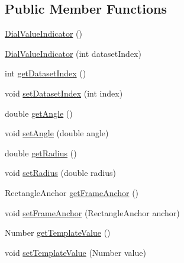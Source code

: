 \subsection*{Public Member Functions}
\begin{DoxyCompactItemize}
\item 
\mbox{\hyperlink{classorg_1_1jfree_1_1chart_1_1plot_1_1dial_1_1_dial_value_indicator_a1e55ae9101de0a8c56baef2b03b89a24}{Dial\+Value\+Indicator}} ()
\item 
\mbox{\hyperlink{classorg_1_1jfree_1_1chart_1_1plot_1_1dial_1_1_dial_value_indicator_a94ae1c9c8adc8b6a51ace19bdb0f73bc}{Dial\+Value\+Indicator}} (int dataset\+Index)
\item 
int \mbox{\hyperlink{classorg_1_1jfree_1_1chart_1_1plot_1_1dial_1_1_dial_value_indicator_adc50504d695c87e02091fa5e50fe5d5d}{get\+Dataset\+Index}} ()
\item 
void \mbox{\hyperlink{classorg_1_1jfree_1_1chart_1_1plot_1_1dial_1_1_dial_value_indicator_a0880bbfe31f19c02655f9565c9ac9e16}{set\+Dataset\+Index}} (int index)
\item 
double \mbox{\hyperlink{classorg_1_1jfree_1_1chart_1_1plot_1_1dial_1_1_dial_value_indicator_a46cace0b19e63ed86380fd39d767fcc0}{get\+Angle}} ()
\item 
void \mbox{\hyperlink{classorg_1_1jfree_1_1chart_1_1plot_1_1dial_1_1_dial_value_indicator_a14bf800c9619a29265c1523a5eed0e41}{set\+Angle}} (double angle)
\item 
double \mbox{\hyperlink{classorg_1_1jfree_1_1chart_1_1plot_1_1dial_1_1_dial_value_indicator_a00272dd6350f35bbbd29f744685cb692}{get\+Radius}} ()
\item 
void \mbox{\hyperlink{classorg_1_1jfree_1_1chart_1_1plot_1_1dial_1_1_dial_value_indicator_a61cf04616e22afc08ab29777c4b8762c}{set\+Radius}} (double radius)
\item 
Rectangle\+Anchor \mbox{\hyperlink{classorg_1_1jfree_1_1chart_1_1plot_1_1dial_1_1_dial_value_indicator_a0c511855e967c4f4bca11620ccfd1920}{get\+Frame\+Anchor}} ()
\item 
void \mbox{\hyperlink{classorg_1_1jfree_1_1chart_1_1plot_1_1dial_1_1_dial_value_indicator_a88eb182999623eac46ffcfcdfea3a207}{set\+Frame\+Anchor}} (Rectangle\+Anchor anchor)
\item 
Number \mbox{\hyperlink{classorg_1_1jfree_1_1chart_1_1plot_1_1dial_1_1_dial_value_indicator_ac3e29f98b70fd192b0c2927c9025f7ae}{get\+Template\+Value}} ()
\item 
void \mbox{\hyperlink{classorg_1_1jfree_1_1chart_1_1plot_1_1dial_1_1_dial_value_indicator_a9b3ddc35fb5d1372514575daeac445ed}{set\+Template\+Value}} (Number value)

\end{DoxyCompactItemize}
